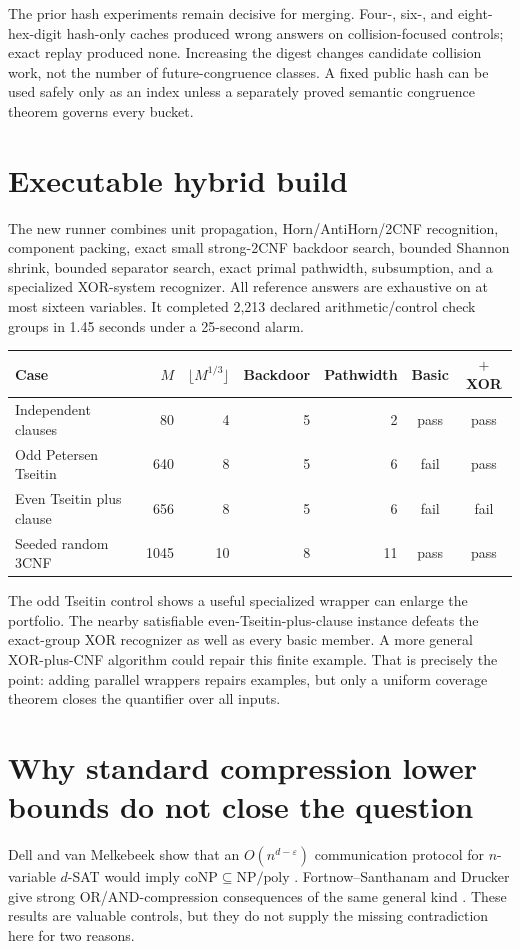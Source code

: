\documentclass[11pt]{article}
\newcommand{\poly}{\mathrm{poly}}
\begin{document}
The prior hash experiments remain decisive for merging.  Four-, six-, and
eight-hex-digit hash-only caches produced wrong answers on collision-focused
controls; exact replay produced none.  Increasing the digest changes candidate
collision work, not the number of future-congruence classes.  A fixed public
hash can be used safely only as an index unless a separately proved semantic
congruence theorem governs every bucket.

\section{Executable hybrid build}
The new runner combines unit propagation, Horn/AntiHorn/2CNF recognition,
component packing, exact small strong-2CNF backdoor search, bounded Shannon
shrink, bounded separator search, exact primal pathwidth, subsumption, and a
specialized XOR-system recognizer.  All reference answers are exhaustive on
at most sixteen variables.  It completed 2,213 declared arithmetic/control
check groups in 1.45 seconds under a 25-second alarm.

\begin{center}
\begin{tabular}{@{}lrrrrcc@{}}
\toprule
Case & $M$ & $\lfloor M^{1/3}\rfloor$ & Backdoor & Pathwidth & Basic & $+$XOR\\
\midrule
Independent clauses & 80 & 4 & 5 & 2 & pass & pass\\
Odd Petersen Tseitin & 640 & 8 & 5 & 6 & fail & pass\\
Even Tseitin plus clause & 656 & 8 & 5 & 6 & fail & fail\\
Seeded random 3CNF & 1045 & 10 & 8 & 11 & pass & pass\\
\bottomrule
\end{tabular}
\end{center}

The odd Tseitin control shows a useful specialized wrapper can enlarge the
portfolio.  The nearby satisfiable even-Tseitin-plus-clause instance defeats
the exact-group XOR recognizer as well as every basic member.  A more general
XOR-plus-CNF algorithm could repair this finite example.  That is precisely the
point: adding parallel wrappers repairs examples, but only a uniform coverage
theorem closes the quantifier over all inputs.

\section{Why standard compression lower bounds do not close the question}
Dell and van Melkebeek show that an $O(n^{d-\varepsilon})$ communication
protocol for $n$-variable $d$-SAT would imply
$\mathrm{coNP}\subseteq\mathrm{NP}/\poly$ \cite{dell2014}.  Fortnow--Santhanam
and Drucker give strong OR/AND-compression consequences of the same general
kind \cite{fortnow2011,drucker2015}.  These results are valuable controls, but
they do not supply the missing contradiction here for two reasons.
\end{document}

